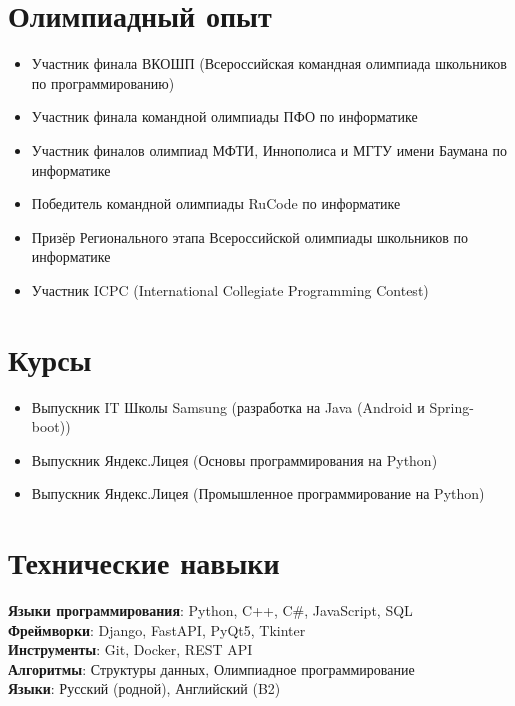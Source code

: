 \documentclass[letterpaper,11pt]{article}
\newcommand{\resumeItem}[1]{
  \item\small{
    {#1 \vspace{-2pt}}
  }
}
\newcommand{\resumeSubHeadingListStart}{\begin{itemize}[leftmargin=0.15in, label={}]}
\newcommand{\resumeSubHeadingListEnd}{\end{itemize}}
\begin{document}
\section{Олимпиадный опыт}
  \resumeSubHeadingListStart
    \resumeItem{Участник финала ВКОШП (Всероссийская командная олимпиада школьников по программированию)}
    \resumeItem{Участник финала командной олимпиады ПФО по информатике}
    \resumeItem{Участник финалов олимпиад МФТИ, Иннополиса и МГТУ имени Баумана по информатике}
    \resumeItem{Победитель командной олимпиады RuCode по информатике}
    \resumeItem{Призёр Регионального этапа Всероссийской олимпиады школьников по информатике}
    \resumeItem{Участник ICPC (International Collegiate Programming Contest)}
  \resumeSubHeadingListEnd

\section{Курсы}
  \resumeSubHeadingListStart
    \resumeItem{Выпускник IT Школы Samsung (разработка на Java (Android и Spring-boot))}
    \resumeItem{Выпускник Яндекс.Лицея (Основы программирования на Python)}
    \resumeItem{Выпускник Яндекс.Лицея (Промышленное программирование на Python)}
  \resumeSubHeadingListEnd

\section{Технические навыки}
 \begin{itemize}[leftmargin=0.15in, label={}]
    \small{\item{
     \textbf{Языки программирования}{: Python, C++, C\#, JavaScript, SQL} \\
     \textbf{Фреймворки}{: Django, FastAPI, PyQt5, Tkinter} \\
     \textbf{Инструменты}{: Git, Docker, REST API} \\
     \textbf{Алгоритмы}{: Структуры данных, Олимпиадное программирование} \\
     \textbf{Языки}{: Русский (родной), Английский (B2)}
    }}
 \end{itemize}
\end{document}
